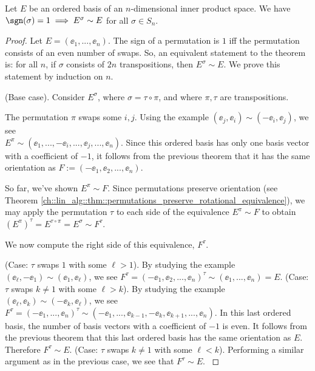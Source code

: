 \begin{lemma}
    Let $E$ be an ordered basis of an $n$-dimensional inner product space. We have $\sgn(\sigma) = 1 \implies E^\sigma \sim E$ for all $\sigma \in S_n$.
\end{lemma}

\begin{proof}
    Let $E = (\ee_1, ..., \ee_n)$. The sign of a permutation is $1$ iff the permutation consists of an even number of swaps. So, an equivalent statement to the theorem is: for all $n$, if $\sigma$ consists of $2n$ transpositions, then $E^\sigma \sim E$. We prove this statement by induction on $n$.
    
    (Base case). Consider $E^\sigma$, where $\sigma = \tau \circ \pi$, and where $\pi, \tau$ are transpositions. 
    
    The permutation $\pi$ swaps some $i, j$. Using the example $(\ee_j, \ee_i) \sim (-\ee_i, \ee_j)$, we see \\ $E^\pi \sim (\ee_1, ..., -\ee_i, ..., \ee_j, ..., \ee_n)$. Since this ordered basis has only one basis vector with a coefficient of $-1$, it follows from the previous theorem that it has the same orientation as $F :=  (-\ee_1, \ee_2, ..., \ee_n)$.

    So far, we've shown $E^\pi \sim F$. Since permutations preserve orientation (see Theorem \ref{ch::lin_alg::thm::permutations_preserve_rotational_equivalence}), we may apply the permutation $\tau$ to each side of the equivalence $E^\pi \sim F$ to obtain $(E^\pi)^\tau = E^{\tau \circ \pi}  = E^\sigma \sim F^\tau$.

    We now compute the right side of this equivalence, $F^\tau$.

    \fullindent
    {
        (Case: $\tau$ swaps $1$ with some $\ell > 1$). By studying the example $(\ee_\ell, -\ee_1) \sim (\ee_1, \ee_\ell)$, we see $F^\tau = (-\ee_1, \ee_2, ..., \ee_n)^\tau \sim (\ee_1, ..., \ee_n) = E$.
    }
    \fullindent
    {
        (Case: $\tau$ swaps $k \neq 1$ with some $\ell > k$). By studying the example $(\ee_\ell, \ee_k) \sim (-\ee_k, \ee_\ell)$, we see $F^\tau = (-\ee_1, ..., \ee_n)^\tau \sim (-\ee_1, ..., \ee_{k - 1}, -\ee_k, \ee_{k + 1}, ..., \ee_n)$. In this last ordered basis, the number of basis vectors with a coefficient of $-1$ is even. It follows from the previous theorem that this last ordered basis has the same orientation as $E$. Therefore $F^\tau \sim E$.
    }
    \fullindent
    {
        (Case: $\tau$ swaps $k \neq 1$ with some $\ell < k$). Performing a similar argument as in the previous case, we see that $F^\tau \sim E$.
    }


\end{proof}
